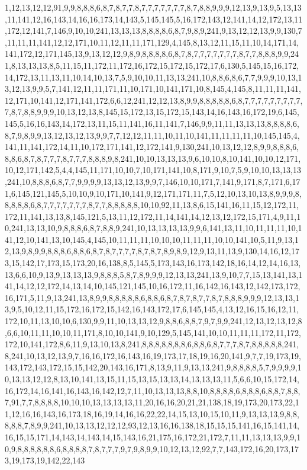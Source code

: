 1,12,13,12,12,91,9,9,8,8,8,6,8,7,8,7,7,8,7,7,7,7,7,7,7,8,7,8,8,9,9,9,12,13,9,13,9,5,13,13,11,141,12,16,143,14,16,16,173,14,143,5,145,145,5,16,172,143,12,141,14,12,172,13,11,172,12,141,7,146,9,10,10,241,13,13,13,8,8,8,8,6,8,7,9,8,9,241,9,13,12,12,13,9,9,130,7,11,11,11,141,12,12,171,10,11,12,11,11,171,129,4,145,8,13,12,11,15,11,10,14,171,14,141,172,12,171,145,13,9,13,12,12,9,8,9,8,8,8,8,6,8,7,8,7,7,7,7,7,7,7,8,7,7,8,8,8,9,9,241,8,13,13,13,8,5,11,15,11,172,11,172,16,172,15,172,15,172,17,6,130,5,145,15,16,172,14,172,13,11,13,11,10,14,10,13,7,5,9,10,10,11,13,13,241,10,8,8,6,8,6,7,7,9,9,9,10,13,13,12,13,9,9,5,7,141,12,11,11,171,11,10,171,10,141,171,10,8,145,4,145,8,11,11,11,141,12,171,10,141,12,171,141,172,6,6,12,241,12,12,13,8,9,9,8,8,8,8,8,6,8,7,7,7,7,7,7,7,7,7,7,8,7,8,8,9,9,9,10,13,12,13,8,145,15,172,13,15,172,15,143,14,16,143,16,172,19,6,145,145,5,16,16,143,14,172,13,11,15,11,141,16,11,141,7,146,9,9,11,11,13,13,13,8,8,8,8,6,8,7,9,8,9,9,13,12,13,12,13,9,9,7,7,12,12,11,11,10,11,10,141,11,11,11,11,10,145,145,4,141,11,141,172,14,11,10,172,171,141,12,172,141,9,130,241,10,13,12,12,8,9,9,8,8,8,6,8,8,6,8,7,8,7,7,7,8,7,7,7,8,8,8,9,8,241,10,10,13,13,13,9,6,10,10,8,10,141,10,10,12,171,10,12,171,142,5,4,4,145,11,171,10,10,7,10,171,141,10,8,171,9,10,7,5,9,10,10,13,13,13,241,10,8,8,8,6,8,7,7,9,9,9,9,13,13,12,13,9,9,7,146,10,10,171,7,141,9,171,8,7,171,6,171,6,145,121,145,5,10,10,9,10,171,10,141,9,12,171,171,11,7,5,12,10,13,10,13,8,9,9,9,8,8,8,8,8,6,8,7,7,7,7,7,7,7,8,7,7,8,8,8,8,8,10,10,92,11,13,8,6,15,141,16,11,15,12,172,11,172,11,141,13,13,8,145,121,5,13,11,12,172,11,14,141,14,12,13,12,172,15,171,4,9,11,10,241,13,13,10,9,8,8,8,6,8,7,8,8,9,241,10,13,13,13,13,9,9,6,141,13,11,10,11,11,11,10,141,12,10,141,13,10,145,4,145,10,11,11,11,10,10,10,11,11,11,10,10,141,10,5,11,9,13,12,13,9,8,9,9,8,8,8,6,8,8,6,8,7,8,7,7,7,7,8,7,8,7,8,9,8,9,12,9,13,11,13,9,130,14,16,12,173,15,142,17,173,15,173,20,16,138,8,5,145,5,173,143,16,173,142,18,16,14,12,14,16,13,13,6,6,10,9,13,9,13,13,13,9,8,8,8,5,8,7,8,9,9,9,12,13,13,241,13,9,10,7,7,15,13,141,13,141,14,12,12,172,14,13,14,10,145,121,145,10,16,172,11,16,142,16,143,12,142,173,172,16,171,5,11,9,13,241,13,8,9,9,8,8,8,8,8,6,8,8,6,8,7,8,7,8,7,7,8,7,8,8,8,9,9,9,12,13,13,13,9,5,10,12,11,15,172,16,172,15,142,16,143,172,17,6,145,145,4,13,12,16,15,16,12,11,172,10,11,13,10,10,6,130,9,9,11,10,13,13,12,9,8,8,6,8,8,7,9,7,9,9,241,12,13,12,13,12,8,6,6,10,11,11,10,10,11,171,8,10,10,141,9,10,129,5,145,141,10,10,11,11,11,172,11,172,172,10,141,172,8,6,11,9,13,10,13,8,241,8,8,8,8,8,8,8,6,8,8,6,8,7,7,7,8,7,8,8,8,8,8,241,8,241,10,13,12,13,9,7,16,16,172,16,143,16,19,173,17,18,19,16,20,141,9,7,7,19,173,19,143,172,143,172,15,15,142,20,143,16,171,8,13,9,11,9,13,13,241,9,8,8,8,8,5,7,9,9,9,9,10,13,13,12,12,8,13,10,141,13,15,11,15,13,15,13,13,14,13,13,13,11,5,6,6,10,15,172,14,16,172,14,16,141,16,143,16,142,12,7,11,10,13,13,13,8,8,10,8,8,8,8,6,8,8,8,6,8,8,7,8,8,7,91,7,7,8,8,8,8,10,10,10,13,13,13,13,11,20,16,16,20,21,21,138,18,19,173,20,173,22,11,12,16,16,143,16,173,18,16,19,14,16,16,22,22,14,15,13,10,15,10,11,9,13,13,13,9,8,8,8,8,8,7,8,9,9,241,10,13,13,12,12,12,93,12,13,16,16,138,18,15,15,15,141,16,15,141,14,16,15,15,171,14,143,14,143,14,15,143,16,21,175,16,172,21,172,7,11,11,13,13,13,9,9,10,9,8,8,8,8,8,8,6,8,8,8,8,7,8,7,7,7,9,7,9,8,9,9,10,12,13,12,92,7,7,143,172,16,20,173,173,19,173,19,142,22,143